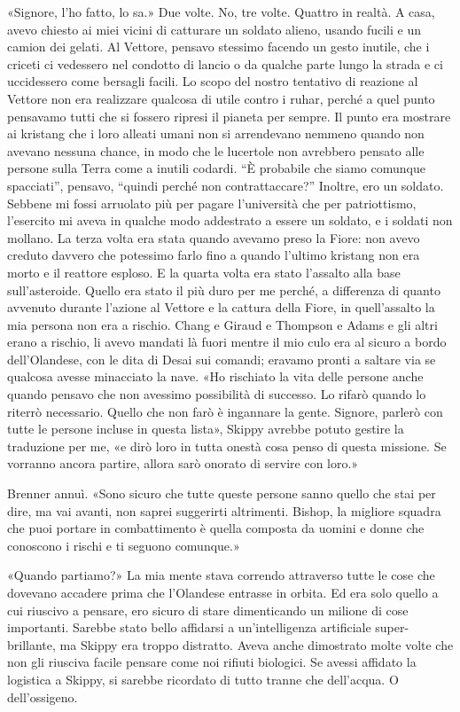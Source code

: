 «Signore, l'ho fatto, lo sa.» Due volte. No, tre volte. Quattro in
realtà. A casa, avevo chiesto ai miei vicini di catturare un soldato
alieno, usando fucili e un camion dei gelati. Al Vettore, pensavo
stessimo facendo un gesto inutile, che i criceti ci vedessero nel
condotto di lancio o da qualche parte lungo la strada e ci uccidessero
come bersagli facili. Lo scopo del nostro tentativo di reazione al
Vettore non era realizzare qualcosa di utile contro i ruhar, perché a
quel punto pensavamo tutti che si fossero ripresi il pianeta per sempre.
Il punto era mostrare ai kristang che i loro alleati umani non si
arrendevano nemmeno quando non avevano nessuna chance, in modo che le
lucertole non avrebbero pensato alle persone sulla Terra come a inutili
codardi. ``È probabile che siamo comunque spacciati'', pensavo, ``quindi
perché non contrattaccare?'' Inoltre, ero un soldato. Sebbene mi fossi
arruolato più per pagare l'università che per patriottismo, l'esercito
mi aveva in qualche modo addestrato a essere un soldato, e i soldati non
mollano. La terza volta era stata quando avevamo preso la Fiore: non
avevo creduto davvero che potessimo farlo fino a quando l'ultimo
kristang non era morto e il reattore esploso. E la quarta volta era
stato l'assalto alla base sull'asteroide. Quello era stato il più duro
per me perché, a differenza di quanto avvenuto durante l'azione al
Vettore e la cattura della Fiore, in quell'assalto la mia persona non
era a rischio. Chang e Giraud e Thompson e Adams e gli altri erano a
rischio, li avevo mandati là fuori mentre il mio culo era al sicuro a
bordo dell'Olandese, con le dita di Desai sui comandi; eravamo pronti a
saltare via se qualcosa avesse minacciato la nave. «Ho rischiato la vita
delle persone anche quando pensavo che non avessimo possibilità di
successo. Lo rifarò quando lo riterrò necessario. Quello che non farò è
ingannare la gente. Signore, parlerò con tutte le persone incluse in
questa lista», Skippy avrebbe potuto gestire la traduzione per me, «e
dirò loro in tutta onestà cosa penso di questa missione. Se vorranno
ancora partire, allora sarò onorato di servire con loro.»

Brenner annuì. «Sono sicuro che tutte queste persone sanno quello che
stai per dire, ma vai avanti, non saprei suggerirti altrimenti. Bishop,
la migliore squadra che puoi portare in combattimento è quella composta
da uomini e donne che conoscono i rischi e ti seguono comunque.»

«Quando partiamo?» La mia mente stava correndo attraverso tutte le cose
che dovevano accadere prima che l'Olandese entrasse in orbita. Ed era
solo quello a cui riuscivo a pensare, ero sicuro di stare dimenticando
un milione di cose importanti. Sarebbe stato bello affidarsi a
un'intelligenza artificiale super-brillante, ma Skippy era troppo
distratto. Aveva anche dimostrato molte volte che non gli riusciva
facile pensare come noi rifiuti biologici. Se avessi affidato la
logistica a Skippy, si sarebbe ricordato di tutto tranne che dell'acqua.
O dell'ossigeno.

